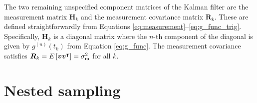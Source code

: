 \documentclass[fleqn,usenatbib,useAMS]{mnras}
\begin{document}
The two remaining unspecified component matrices of the Kalman filter are the measurement matrix $\boldsymbol{H}_k$ and the measurement covariance matrix $\boldsymbol{R}_k$. These are defined straightforwardly from Equations \eqref{eq:measurement}--\eqref{eq:g_func_trig}. Specifically, 
$\boldsymbol{H}_k$ is a diagonal matrix where the $n$-th component of the diagonal is given by $g^{(n)}(t_k)$ from Equation \eqref{eq:g_func}. The measurement covariance satisfies $\boldsymbol{R}_k = E \left[ \boldsymbol{v} \boldsymbol{v}^\intercal \right] = \sigma^2_{\rm m}$ for all $k$.





\section{Nested sampling}
\end{document}
